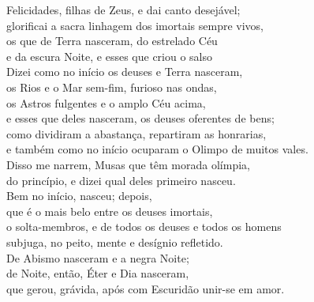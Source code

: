 \begin{pages}
\begin{Rightside}
\quad{}Felicidades, filhas de Zeus, e dai canto desejável;\\
glorificai a sacra linhagem dos imortais sempre vivos, \\
os que de Terra nasceram, do estrelado Céu\\
e da escura Noite, e esses que criou o salso \\
Dizei como no início os deuses e Terra nasceram,\\
os Rios e o Mar sem-fim, furioso nas ondas,\\
os Astros fulgentes e o amplo Céu acima, \\
e esses que deles nasceram, os deuses oferentes de bens;\\
como dividiram a abastança, repartiram as honrarias,\\
e também como no início ocuparam o Olimpo de muitos vales.\\
Disso me narrem, Musas que têm morada olímpia,\\
do princípio, e dizei qual deles primeiro nasceu. \\

\quad{}Bem no início,  nasceu; depois,\\
 que é o mais belo entre os deuses imortais,\\
o solta-membros, e de todos os deuses e todos os homens\\
subjuga, no peito, mente e desígnio refletido.\\

\Para
De Abismo nasceram  e a negra Noite;\\
de Noite, então, Éter e Dia nasceram,\\
que gerou, grávida, após com Escuridão unir-se em amor.\\


\end{Rightside}
\end{pages}
